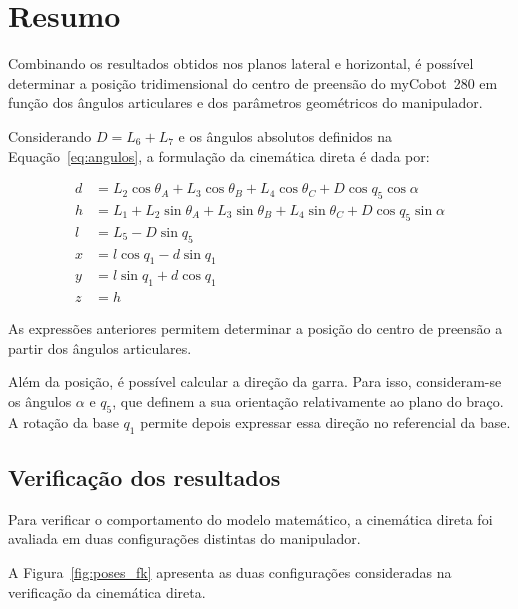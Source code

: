 
\section{Resumo}
\label{sec:dk_resumo}

Combinando os resultados obtidos nos planos lateral e horizontal, é possível determinar a posição tridimensional do centro de preensão do myCobot~280 em função dos ângulos articulares e dos parâmetros geométricos do manipulador.

Considerando $D=L_6+L_7$ e os ângulos absolutos definidos na Equação~\eqref{eq:angulos}, a formulação da cinemática direta é dada por:

\begin{equation}
    \boxed{
    \begin{aligned}
        d &= L_2\cos\theta_A
        + L_3\cos\theta_B
        + L_4\cos\theta_C
        + D\cos q_5\cos\alpha\\
        h &= L_1
        + L_2\sin\theta_A
        + L_3\sin\theta_B
        + L_4\sin\theta_C
        + D\cos q_5\sin\alpha\\
        l &= L_5-D\sin q_5\\[4pt]
        x &= l\cos q_1-d\sin q_1\\
        y &= l\sin q_1+d\cos q_1\\
        z &= h
    \end{aligned}
    }
    \label{eq:dk_final}
\end{equation}


As expressões anteriores permitem determinar a posição do centro de preensão a partir dos ângulos articulares.

Além da posição, é possível calcular a direção da garra. Para isso, consideram-se os ângulos $\alpha$ e $q_5$, que definem a sua orientação relativamente ao plano do braço. A rotação da base $q_1$ permite depois expressar essa direção no referencial da base.


\iffalse
    

\subsection{Verificação dos resultados}

Para verificar o comportamento do modelo matemático, a cinemática direta foi avaliada em duas configurações distintas do manipulador.

A Figura~\ref{fig:poses_fk} apresenta as duas configurações consideradas na verificação da cinemática direta.


